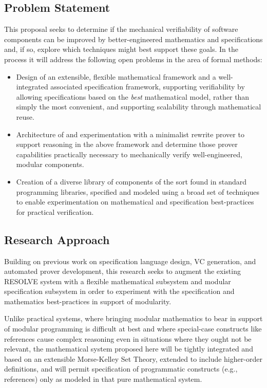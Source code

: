 \subsection{Problem Statement}
This proposal seeks to determine if the mechanical verifiability of software components can be improved by better-engineered mathematics and specifications and, if so, explore which techniques might best support these goals.  In the process it will address the following open problems in the area of formal methods:

\begin{itemize}
\item Design of an extensible, flexible mathematical framework and a well-integrated associated specification framework, supporting verifiability by allowing specifications based on the \emph{best} mathematical model, rather than simply the most convenient, and supporting scalability through mathematical reuse.
\item Architecture of and experimentation with a minimalist rewrite prover to support reasoning in the above framework and determine those prover capabilities practically necessary to mechanically verify well-engineered, modular components.
\item Creation of a diverse library of components of the sort found in standard programming libraries, specified and modeled using a broad set of techniques to enable experimentation on mathematical and specification best-practices for practical verification.
\end{itemize}

\subsection{Research Approach}
Building on previous work on specification language design, VC generation, and automated prover development, this research seeks to augment the existing RESOLVE\cite{Sit11} system with a flexible mathematical subsystem and modular specification subsystem in order to experiment with the specification and mathematics best-practices in support of modularity.

Unlike practical systems, where bringing modular mathematics to bear in support of modular programming is difficult at best and where special-case constructs like references cause complex reasoning even in situations where they ought not be relevant, the mathematical system proposed here will be tightly integrated and based on an extensible Morse-Kelley Set Theory, extended to include higher-order definitions, and will permit specification of programmatic constructs (e.g., references) only as modeled in that pure mathematical system.

